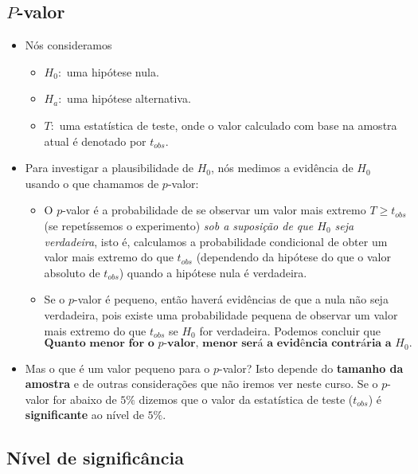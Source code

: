 \documentclass[]{article}
\providecommand{\tightlist}{%
  \setlength{\itemsep}{0pt}\setlength{\parskip}{0pt}}
\begin{document}
\subsection{\texorpdfstring{\(P\)-valor}{P-valor}}\label{p-valor}

\begin{itemize}
\tightlist
\item
  Nós consideramos

  \begin{itemize}
  \tightlist
  \item
    \(H_0\):~uma hipótese nula.
  \item
    \(H_a\):~uma hipótese alternativa.
  \item
    \(T\):~uma estatística de teste, onde o valor calculado com base na
    amostra atual é denotado por \(t_{obs}\).
  \end{itemize}
\item
  Para investigar a plausibilidade de \(H_0\), nós medimos a evidência
  de \(H_0\) usando o que chamamos de \(p\)-valor:

  \begin{itemize}
  \tightlist
  \item
    O \(p\)-valor é a probabilidade de se observar um valor mais extremo
    \(T \geq t_{obs}\) (se repetíssemos o experimento) \emph{sob a
    suposição de que \(H_0\) seja verdadeira}, isto é, calculamos a
    probabilidade condicional de obter um valor mais extremo do que
    \(t_{obs}\) (dependendo da hipótese do que o valor absoluto de
    \(t_{obs}\)) quando a hipótese nula é verdadeira.
  \item
    Se o \(p\)-valor é pequeno, então haverá evidências de que a nula
    não seja verdadeira, pois existe uma probabilidade pequena de
    observar um valor mais extremo do que \(t_{obs}\) se \(H_0\) for
    verdadeira. Podemos concluir que \[
      \textbf{Quanto menor for o  $p$-valor, menor será a evidência contrária a $H_0$.} 
      \]
  \end{itemize}
\item
  Mas o que é um valor pequeno para o \(p\)-valor? Isto depende do
  \textbf{tamanho da amostra} e de outras considerações que não iremos
  ver neste curso. Se o \(p\)-valor for abaixo de \(5\%\) dizemos que o
  valor da estatística de teste (\(t_{obs}\)) é \textbf{significante} ao
  nível de \(5\%\).
\end{itemize}

\subsection{Nível de significância}\label{nivel-de-significancia}
\end{document}
